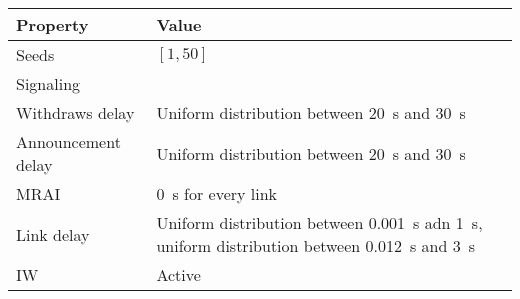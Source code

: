 \begin{center}
	\begin{tabular}{ || m{4cm}| m{7.5cm} || }
	\hline
	Property & Value \\
	\hline \hline
	Seeds & $[1, 50]$ \\
	\hline
	Signaling & \q{AW} \\
	\hline
	Withdraws delay & Uniform distribution between \SI{20}{\second} and \SI{30}{\second} \\
	\hline
	Announcement delay & Uniform distribution between \SI{20}{\second} and \SI{30}{\second} \\
	\hline
    \ac{MRAI} & \SI{0}{\second} for every link \\
	\hline
	Link delay & Uniform distribution between \SI{0.001}{\second} adn \SI{1}{\second}, uniform distribution between \SI{0.012}{\second} and \SI{3}{\second} \\
	\hline
    \ac{IW} & Active \\
	\hline
	\end{tabular}
\end{center}
